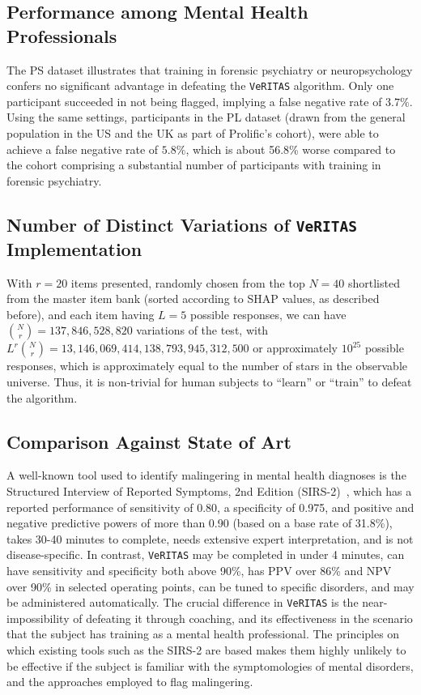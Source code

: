 \documentclass[onecolumn,10pt]{IEEEtran}
\def\vrts{\texttt{VeRITAS}\xspace}
\begin{document}
\subsection*{Performance among Mental Health Professionals}
The PS dataset illustrates that training in forensic psychiatry or neuropsychology confers no significant
advantage in defeating the \vrts algorithm. Only one participant succeeded in not being flagged, implying a
false negative rate of $3.7\%$. Using the same settings, participants in the PL dataset (drawn from the general population in the US and the UK
as part of Prolific's cohort), were able to achieve a false negative rate of $5.8\%$, which is about 56.8\% worse compared to the cohort comprising a substantial number of participants with training in forensic psychiatry.

\subsection*{Number of Distinct Variations of \vrts Implementation}
With $r=20$ items presented, randomly chosen from the top $N=40$ shortlisted from the master item bank (sorted according to SHAP values, as described before), and each item having  $L=5$ possible responses, we can have $\binom{N}{r}=137,846,528,820$ variations of the test, with  $L^r\binom{N}{r} = 13,146,069,414,138,793,945,312,500$ or approximately $10^{25}$ possible responses, which is approximately equal to the number of stars in the observable universe. Thus, it is non-trivial for human subjects to ``learn'' or ``train'' to defeat the algorithm.

\subsection*{Comparison Against State of Art}
A well-known tool used to identify malingering in mental health diagnoses is the Structured Interview of Reported Symptoms, 2nd Edition (SIRS-2)~\cite{Wong2005}, which  has a reported performance of sensitivity of 0.80, a specificity of 0.975, and positive and negative predictive powers of more than 0.90 (based on a base rate of 31.8\%), takes 30-40 minutes to complete,  needs extensive expert interpretation, and is not disease-specific. In contrast, \vrts may be completed in under 4 minutes, can have sensitivity and specificity both above 90\%, has PPV over 86\% and NPV over 90\% in selected operating points, can be tuned to specific disorders, and may be administered automatically. The crucial difference in \vrts is the near-impossibility of defeating it through coaching, and its effectiveness in the scenario that the subject has training as a mental health professional. The principles on which existing tools such as the SIRS-2 are based makes them highly unlikely to be effective if the subject is familiar with the symptomologies of  mental disorders, and the approaches  employed to flag malingering.
\end{document}

